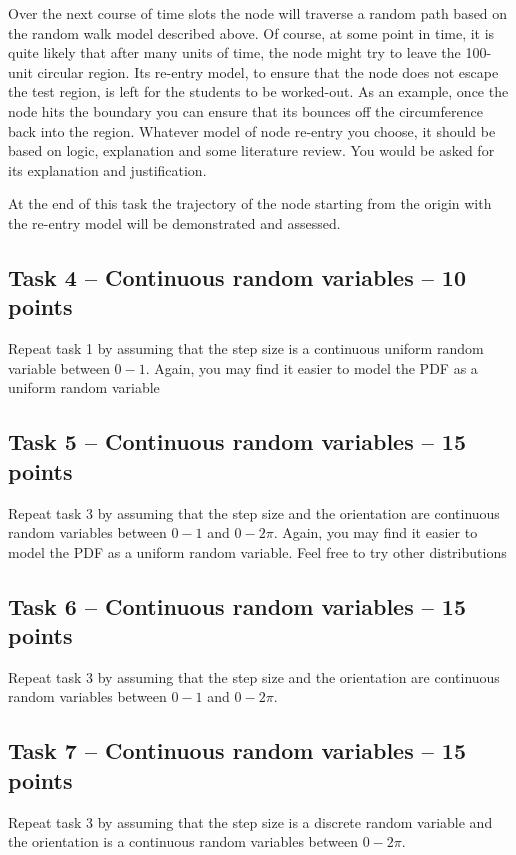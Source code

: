 \documentclass[a4paper, 11pt]{article}
\begin{document}
Over the next course of time slots the node will traverse a random path based on the random walk model described above.  Of course, at some point in time, it is quite likely that after many units of time, the node might try to leave the 100-unit circular region. Its re-entry model, to ensure that the node does not escape the test region, is left for the students to be worked-out.  As an example, once the node hits the boundary you can ensure that its bounces off the circumference back into the region. Whatever model of node re-entry you choose, it should be based on logic, explanation and some literature review. You would be asked for its explanation and justification. 

At the end of this task the trajectory of the node starting from the origin with the re-entry model will be demonstrated and assessed.  

\subsection {Task 4 -- Continuous random variables -- 10 points}
Repeat task 1 by assuming that the step size is a continuous uniform random variable between $0 - 1$. Again, you may find it easier to model the PDF as a uniform random variable

\subsection {Task 5 -- Continuous random variables -- 15 points}
Repeat task 3 by assuming that the step size and the orientation are continuous random variables between $0-1$ and $0 - 2\pi$. Again, you may find it easier to model the PDF as a uniform random variable. Feel free to try other distributions

\subsection {Task 6 -- Continuous random variables -- 15 points}
Repeat task 3 by assuming that the step size and the orientation are continuous random variables between $0 - 1$ and $0 - 2\pi$.

\subsection {Task 7 -- Continuous random variables -- 15 points}
Repeat task 3 by assuming that the step size is a discrete random variable and the orientation is a continuous random variables between $0 - 2\pi$. 
\end{document}
